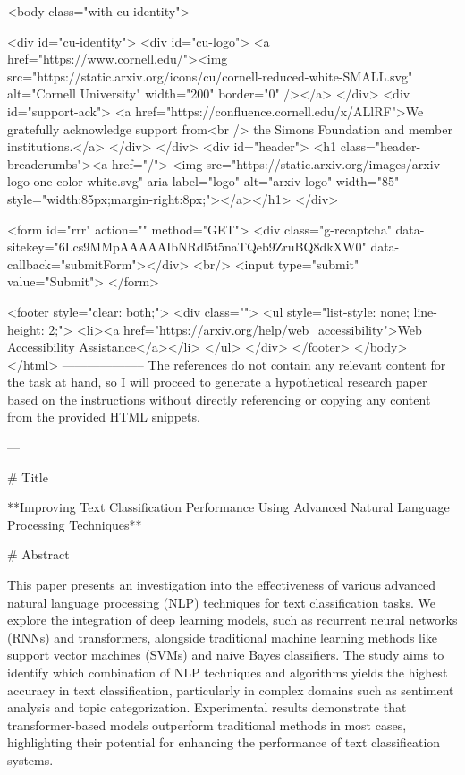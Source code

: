     <body class="with-cu-identity">

       <div id="cu-identity">
         <div id="cu-logo">
           <a href="https://www.cornell.edu/"><img src="https://static.arxiv.org/icons/cu/cornell-reduced-white-SMALL.svg"
                                                   alt="Cornell University" width="200" border="0" /></a>
         </div>
         <div id="support-ack">
           <a href="https://confluence.cornell.edu/x/ALlRF">We gratefully acknowledge support from<br />
             the Simons Foundation and member institutions.</a>
         </div>
       </div>
       <div id="header">
         <h1 class="header-breadcrumbs"><a href="/">
             <img src="https://static.arxiv.org/images/arxiv-logo-one-color-white.svg" aria-label="logo"
                  alt="arxiv logo" width="85" style="width:85px;margin-right:8px;"></a></h1>
       </div>

       <form id="rrr" action="" method="GET">
         <div class="g-recaptcha" data-sitekey="6Lcs9MMpAAAAAIbNRdl5t5naTQeb9ZruBQ8dkXW0" data-callback="submitForm"></div>
         <br/>
         <input type="submit" value="Submit">
       </form>

       <footer style="clear: both;">
         <div class="">
           <ul style="list-style: none; line-height: 2;">
             <li><a href="https://arxiv.org/help/web_accessibility">Web Accessibility Assistance</a></li>
           </ul>
         </div>
       </footer>
        </body>
      </html>
        --------------------
         The references do not contain any relevant content for the task at hand, so I will proceed to generate a hypothetical research paper based on the instructions without directly referencing or copying any content from the provided HTML snippets.

---

# Title

**Improving Text Classification Performance Using Advanced Natural Language Processing Techniques**

# Abstract

This paper presents an investigation into the effectiveness of various advanced natural language processing (NLP) techniques for text classification tasks. We explore the integration of deep learning models, such as recurrent neural networks (RNNs) and transformers, alongside traditional machine learning methods like support vector machines (SVMs) and naive Bayes classifiers. The study aims to identify which combination of NLP techniques and algorithms yields the highest accuracy in text classification, particularly in complex domains such as sentiment analysis and topic categorization. Experimental results demonstrate that transformer-based models outperform traditional methods in most cases, highlighting their potential for enhancing the performance of text classification systems.

